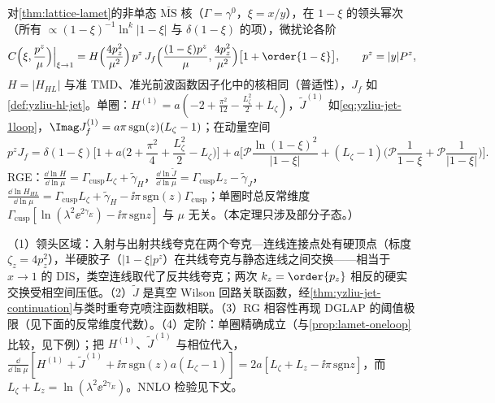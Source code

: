 \begin{theorem}\label{thm:yzliu-threshold}
对\cref{thm:lattice-lamet}的非单态 $\overline{\mathrm{MS}}$ 核（$\Gamma=\gamma^0$，$\xi=x/y$），在 $1-\xi$ 的领头幂次（所有 $\propto(1-\xi)^{-1}\ln^k|1-\xi|$ 与 $\delta(1-\xi)$ 的项），微扰论各阶
\begin{equation}\label{eq:yzliu-threshold}
C\Big(\xi,\frac{p^z}{\mu}\Big)\Big|_{\xi\to1}=H\Big(\frac{4p_z^2}{\mu^2}\Big)\,p^z\,J_f\Big(\frac{(1-\xi)p^z}{\mu},\frac{4p_z^2}{\mu^2}\Big)\big[1+\order{1-\xi}\big],\qquad p^z=|y|P^z ,
\end{equation}
$H=|H_{HL}|$ 与准 TMD、准光前波函数因子化中的核相同（普适性），$J_f$ 如\cref{def:yzliu-hl-jet}。单圈：$H^{(1)}=a(-2+\frac{\pi^2}{12}-\frac{L_\zeta^2}2+L_\zeta)$，$\tilde J^{(1)}$ 如\cref{eq:yzliu-jet-1loop}，$\Imag J^{(1)}_f=a\pi\,\mathrm{sgn}(z)(L_\zeta-1)$；在动量空间 %
\begin{equation}\label{eq:yzliu-Jf-mom}
p^zJ_f=\delta(1-\xi)\Big[1+a\Big(2+\frac{\pi^2}4+\frac{L_\zeta^2}2-L_\zeta\Big)\Big]+a\Big[\mathcal P\frac{\ln(1-\xi)^2}{|1-\xi|}+(L_\zeta-1)\Big(\mathcal P\frac1{1-\xi}+\mathcal P\frac1{|1-\xi|}\Big)\Big].
\end{equation}
RGE：$\frac{\dd\ln H}{\dd\ln\mu}=\Gamma_{\mathrm{cusp}}L_\zeta+\tilde\gamma_H$，$\frac{\dd\ln\tilde J}{\dd\ln\mu}=\Gamma_{\mathrm{cusp}}L_z-\tilde\gamma_J$，$\frac{\dd\ln H_{HL}}{\dd\ln\mu}=\Gamma_{\mathrm{cusp}}L_\zeta+\tilde\gamma_H-\ii\pi\,\mathrm{sgn}(z)\Gamma_{\mathrm{cusp}}$；单圈时总反常维度 $\Gamma_{\mathrm{cusp}}[\ln(\lambda^2\ee^{2\gamma_E})-\ii\pi\,\mathrm{sgn}z]$ 与 $\mu$ 无关。（本定理只涉及部分子态。）
\end{theorem}

\begin{proofsketch}
（1）领头区域\cite[第~1--2~节、图~1]{Ji:2023pba}：入射与出射共线夸克在两个夸克—连线连接点处有硬顶点（标度 $\zeta_z=4p_z^2$），半硬胶子（$|1-\xi|p^z$）在共线夸克与静态连线之间交换——相当于 $x\to1$ 的 DIS\cite{Sterman1987,BecherNeubertPecjak2007}，类空连线取代了反共线夸克；两次 $k_z=\order{p_z}$ 相反的硬实交换受相空间压低。（2）$\tilde J$ 是真空 Wilson 回路关联函数，经\cref{thm:yzliu-jet-continuation}与类时重夸克喷注函数相联。（3）RG 相容性再现 DGLAP 的阈值极限（见下面的反常维度代数）。（4）定阶：单圈精确成立（与\cref{prop:lamet-oneloop}比较，见下例）；把 $H^{(1)}$、$\tilde J^{(1)}$ 与相位代入，$\frac{\dd}{\dd\ln\mu}[H^{(1)}+\tilde J^{(1)}+\ii\pi\,\mathrm{sgn}(z)a(L_\zeta-1)]=2a[L_\zeta+L_z-\ii\pi\,\mathrm{sgn}z]$，而 $L_\zeta+L_z=\ln(\lambda^2\ee^{2\gamma_E})$。NNLO 检验见下文。
\end{proofsketch}

